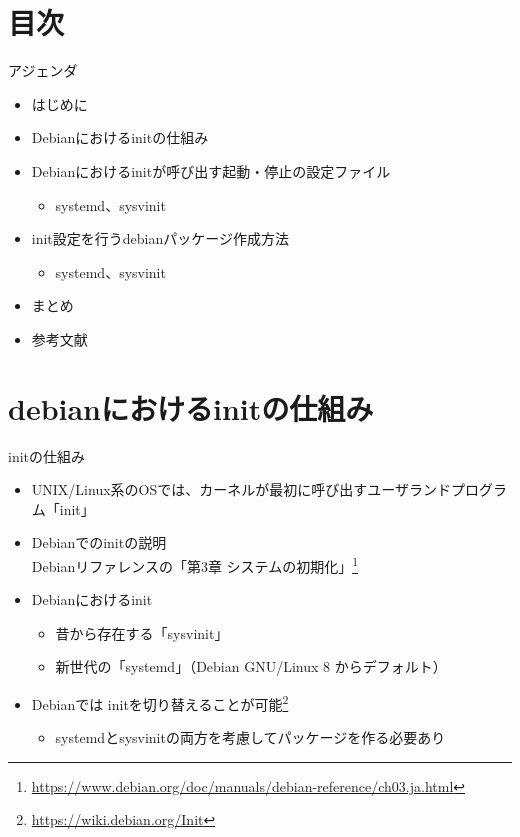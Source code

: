 \section{目次}

\begin{frame}{アジェンダ}
  \begin{itemize}
  \item はじめに
  \item Debianにおけるinitの仕組み
  \item Debianにおけるinitが呼び出す起動・停止の設定ファイル
    \begin{itemize}
    \item systemd、sysvinit
    \end{itemize}
  \item init設定を行うdebianパッケージ作成方法 
    \begin{itemize}
    \item systemd、sysvinit
    \end{itemize}
  \item まとめ
  \item 参考文献
  \end{itemize}
\end{frame}


\section{debianにおけるinitの仕組み}

\begin{frame}[containsverbatim]{initの仕組み}
  \begin{itemize}
  \item UNIX/Linux系のOSでは、カーネルが最初に呼び出すユーザランドプログラム「init」
  \item Debianでのinitの説明 \\Debianリファレンスの「第3章 システムの初期化」\footnote{\url{https://www.debian.org/doc/manuals/debian-reference/ch03.ja.html}}
  \item Debianにおけるinit
    \begin{itemize}
    \item 昔から存在する「sysvinit」
    \item 新世代の「systemd」（Debian GNU/Linux 8 からデフォルト） 
    \end{itemize}
  \item Debianでは initを切り替えることが可能\footnote{\url{https://wiki.debian.org/Init}}
    \begin{itemize}
    \item systemdとsysvinitの両方を考慮してパッケージを作る必要あり
    \end{itemize}
  \end{itemize}
\end{frame}


